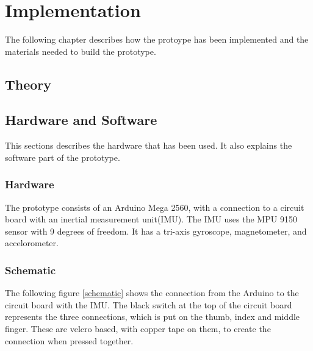 \chapter{Implementation}

The following chapter describes how the protoype has been implemented and the materials needed to build the prototype. 

\section{Theory}




\section{Hardware and Software}

This sections describes the hardware that has been used. It also explains the software part of the prototype. 

\subsection{Hardware}

The prototype consists of an Arduino Mega 2560\citep{Arduino}, with a connection to a circuit board with an inertial measurement unit(IMU). 
The IMU uses the MPU 9150 sensor with 9 degrees of freedom\citep{MPU}. It has a tri-axis gyroscope, magnetometer, and accelorometer.

\subsection{Schematic} 

The following figure \ref{schematic} shows the connection from the Arduino to the circuit board with the IMU. The black switch at the top of the circuit board
represents the three connections, which is put on the thumb, index and middle finger. These are velcro based, with copper tape on them, to create the connection when pressed together. 

\begin{minipage}{\linewidth}%
\label{schematic}
\end{minipage}\\

